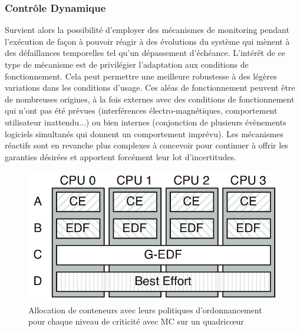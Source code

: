 \documentclass[french, a4paper, 11pt, twoside, pdftex]{StyleThese}
\begin{document}
    
	\subsubsection{Contrôle Dynamique}
    
     Survient alors la possibilité d'employer des mécanismes de monitoring pendant l'exécution de façon à pouvoir réagir à des évolutions du système qui mènent à des défaillances temporelles tel qu'un dépassement d'échéance. L'intérêt de ce type de mécanisme est de privilégier l'adaptation aux conditions de fonctionnement. Cela peut permettre une meilleure robustesse à des légères variations dans les conditions d'usage. Ces aléas de fonctionnement peuvent être de nombreuses origines, à la fois externes avec des conditions de fonctionnement qui n'ont pas été prévues (interférences électro-magnétiques, comportement utilisateur inattendu...) ou bien internes (conjonction de plusieurs évènements logiciels simultanés qui donnent un comportement imprévu). Les mécanismes réactifs sont en revanche plus complexes à concevoir pour continuer à offrir les garanties désirées et apportent forcément leur lot d'incertitudes. 
     
     \begin{figure}[ht]
     	\centering
     	\includegraphics[width=0.7\linewidth]{schemas/MC2_scheduling_model}
     	\captionsetup{justification=centering} 
     	\caption[Politique d'ordonnancement avec MC sur quadricœur~\cite{herman_rtos_2012}]{Allocation de conteneurs avec leurs politiques d'ordonnancement pour chaque niveau de criticité avec MC sur un quadricœur~\cite{herman_rtos_2012}}
     	\label{fig:mc2schedulingmodel}
     \end{figure}
 
\end{document}
